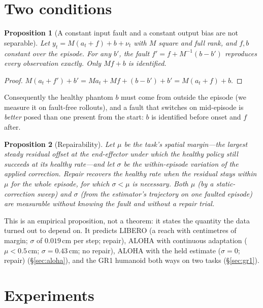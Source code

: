 \documentclass{article}
\newtheorem{proposition}{Proposition}
\begin{document}
\section{Two conditions}
\label{sec:theory}

\begin{proposition}[A constant input fault and a constant output bias are not separable]
\label{prop:sep}
Let $y_t = M(a_t + f) + b + \nu_t$ with $M$ square and full rank, and $f,b$ constant over
the episode. For any $b'$, the fault $f' = f + M^{-1}(b - b')$ reproduces every observation
exactly. Only $Mf + b$ is identified.
\end{proposition}
\begin{proof}
$M(a_t+f') + b' = M a_t + Mf + (b - b') + b' = M(a_t + f) + b$.
\end{proof}
\noindent Consequently the healthy phantom $b$ must come from outside the episode (we measure
it on fault-free rollouts), and a fault that switches on mid-episode is \emph{better} posed
than one present from the start: $b$ is identified before onset and $f$ after.

\begin{proposition}[Repairability]
\label{prop:repair}
Let $\mu$ be the task's spatial margin---the largest steady residual offset at the
end-effector under which the healthy policy still succeeds at its healthy rate---and let
$\sigma$ be the within-episode variation of the applied correction. Repair recovers the
healthy rate when the residual stays within $\mu$ for the whole episode, for which
$\sigma < \mu$ is necessary. Both $\mu$ (by a static-correction sweep) and $\sigma$ (from
the estimator's trajectory on one faulted episode) are measurable without knowing the fault
and without a repair trial.
\end{proposition}
\noindent This is an empirical proposition, not a theorem: it states the quantity the data
turned out to depend on. It predicts LIBERO (a reach with centimetres of margin; $\sigma$ of
$0.019$\,cm per step; repair), ALOHA with continuous adaptation ($\mu<0.5$\,cm;
$\sigma = 0.43$\,cm; no repair), ALOHA with the held estimate ($\sigma=0$; repair)
(\S\ref{sec:aloha}), and the GR1 humanoid both ways on two tasks (\S\ref{sec:gr1}).

\section{Experiments}
\label{sec:exp}
\end{document}
